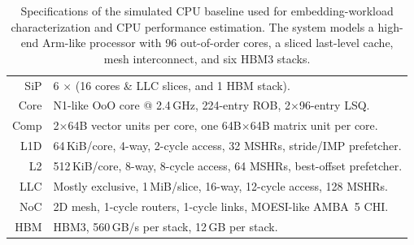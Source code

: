 \begin{table}[]
    \centering
    \caption[Specifications of the CPU baseline for embedding workloads.]{Specifications of the simulated CPU baseline used for embedding-workload characterization and CPU performance estimation. The system models a high-end Arm-like processor with 96 out-of-order cores, a sliced last-level cache, mesh interconnect, and six HBM3 stacks.}
    \vspace{-0.5em}
    \begin{tabular}{rl}
        \toprule
        SiP & 6 $\times$ (16 cores \& LLC slices, and 1 HBM stack). \\
        Core & N1-like OoO core @ 2.4\,GHz, 224-entry ROB, 2$\times$96-entry LSQ. \\
        Comp & 2$\times$64B vector units per core, one 64B$\times$64B matrix unit per core. \\
        L1D & 64\,KiB/core, 4-way, 2-cycle access, 32 MSHRs, stride/IMP prefetcher. \\
        L2 & 512\,KiB/core, 8-way, 8-cycle access, 64 MSHRs, best-offset prefetcher. \\
        LLC & Mostly exclusive, 1\,MiB/slice, 16-way, 12-cycle access, 128 MSHRs. \\
        NoC & 2D mesh, 1-cycle routers, 1-cycle links, MOESI-like AMBA~5 CHI. \\
        HBM & HBM3, 560\,GB/s per stack, 12\,GB per stack. \\
        \bottomrule
    \end{tabular}
    \label{tab:embedding-cpu-system-specs}
\end{table}
